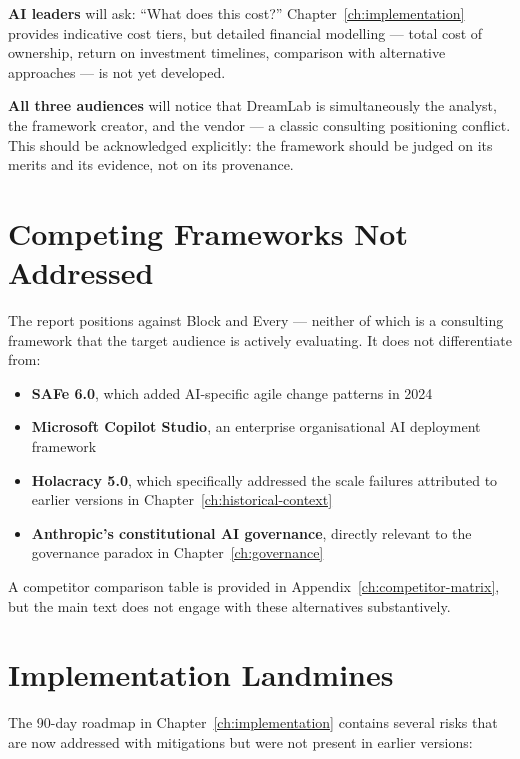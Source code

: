 \textbf{AI leaders} will ask: ``What does this cost?'' Chapter~\ref{ch:implementation} provides indicative cost tiers, but detailed financial modelling --- total cost of ownership, return on investment timelines, comparison with alternative approaches --- is not yet developed.

\textbf{All three audiences} will notice that DreamLab is simultaneously the analyst, the framework creator, and the vendor --- a classic consulting positioning conflict. This should be acknowledged explicitly: the framework should be judged on its merits and its evidence, not on its provenance.

\section{Competing Frameworks Not Addressed}

The report positions against Block and Every --- neither of which is a consulting framework that the target audience is actively evaluating. It does not differentiate from:

\begin{itemize}
  \item \textbf{SAFe 6.0}, which added AI-specific agile change patterns in 2024
  \item \textbf{Microsoft Copilot Studio}, an enterprise organisational AI deployment framework
  \item \textbf{Holacracy 5.0}, which specifically addressed the scale failures attributed to earlier versions in Chapter~\ref{ch:historical-context}
  \item \textbf{Anthropic's constitutional AI governance}, directly relevant to the governance paradox in Chapter~\ref{ch:governance}
\end{itemize}

A competitor comparison table is provided in Appendix~\ref{ch:competitor-matrix}, but the main text does not engage with these alternatives substantively.

\section{Implementation Landmines}

The 90-day roadmap in Chapter~\ref{ch:implementation} contains several risks that are now addressed with mitigations but were not present in earlier versions:

